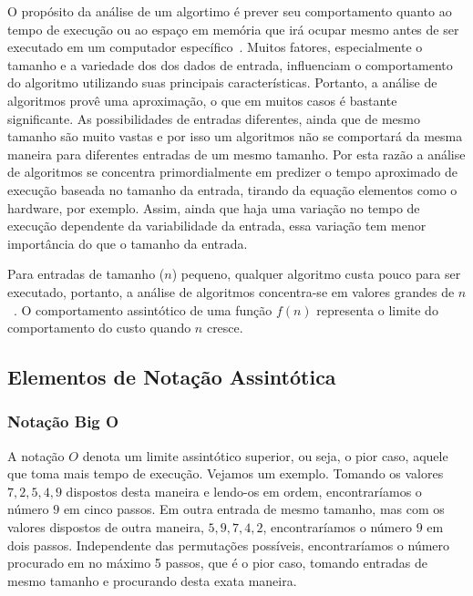 \documentclass[11pt,fleqn]{book} %
\begin{document}
O propósito da análise de um algortimo é prever seu comportamento quanto ao tempo de execução ou ao espaço em memória que irá ocupar mesmo antes de ser executado em um computador específico~\cite{manber1989}.
Muitos fatores, especialmente o tamanho e a variedade dos dos dados de entrada, influenciam o comportamento do algoritmo utilizando suas principais características.
Portanto, a análise de algoritmos provê uma aproximação, o que em muitos casos é bastante significante.
As possibilidades de entradas diferentes, ainda que de mesmo tamanho são muito vastas e por isso um algoritmos não se comportará da mesma maneira para diferentes entradas de um mesmo tamanho. 
Por esta razão a análise de algoritmos se concentra primordialmente em predizer o tempo aproximado de execução baseada no tamanho da entrada, tirando da equação elementos como o hardware, por exemplo.
Assim, ainda que haja uma variação no tempo de execução dependente da variabilidade da entrada, essa variação tem menor importância do que o tamanho da entrada.

Para entradas de tamanho ($n$) pequeno, qualquer algoritmo custa pouco para ser executado, portanto, a análise de algoritmos concentra-se em valores grandes de $n$~\cite{ziviani2007}.
O comportamento assintótico de uma função $f(n)$ representa o limite do comportamento do custo quando $n$ cresce.

\subsection{Elementos de Notação Assintótica}

\subsubsection{Notação Big O}
A notação $O$ denota um limite assintótico superior, ou seja, o pior caso, aquele que toma mais tempo de execução.
Vejamos um exemplo. 
Tomando os valores $7, 2, 5, 4, 9$ dispostos desta maneira e lendo-os em ordem, encontraríamos o número $9$ em cinco passos.
Em outra entrada de mesmo tamanho, mas com os valores dispostos de outra maneira, $5, 9, 7, 4, 2$, encontraríamos o número $9$ em dois passos.
Independente das permutações possíveis, encontraríamos o número procurado em no máximo 5 passos, que é o pior caso, tomando entradas de mesmo tamanho e procurando desta exata maneira.
\end{document}
